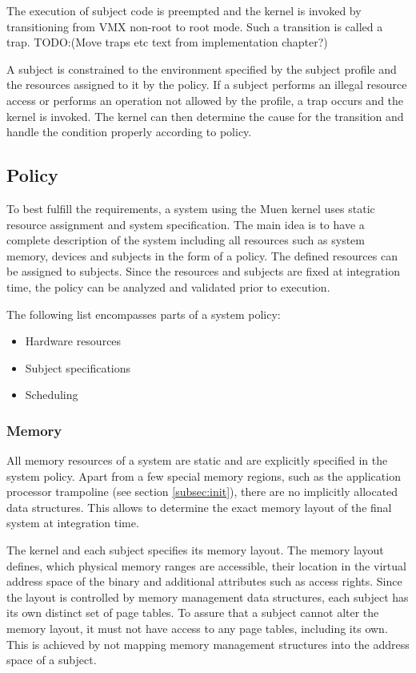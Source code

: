 The execution of subject code is preempted and the kernel is invoked by
transitioning from VMX non-root to root mode. Such a transition is called a
trap. TODO:(Move traps etc text from implementation chapter?)

A subject is constrained to the environment specified by the subject profile and
the resources assigned to it by the policy. If a subject performs an illegal
resource access or performs an operation not allowed by the profile, a trap
occurs and the kernel is invoked. The kernel can then determine the cause for
the transition and handle the condition properly according to policy.

\subsection{Policy}
To best fulfill the requirements, a system using the Muen kernel uses static
resource assignment and system specification. The main idea is to have a
complete description of the system including all resources such as system
memory, devices and subjects in the form of a policy. The defined resources can
be assigned to subjects. Since the resources and subjects are fixed at
integration time, the policy can be analyzed and validated prior to execution.

The following list encompasses parts of a system policy:
\begin{itemize}
	\item Hardware resources
	\item Subject specifications
	\item Scheduling
\end{itemize}

\subsubsection{Memory}
All memory resources of a system are static and are explicitly specified in the
system policy. Apart from a few special memory regions, such as the application
processor trampoline (see section \ref{subsec:init}), there are no implicitly
allocated data structures. This allows to determine the exact memory layout of
the final system at integration time.

The kernel and each subject specifies its memory layout. The memory layout
defines, which physical memory ranges are accessible, their location in the
virtual address space of the binary and additional attributes such as access
rights. Since the layout is controlled by memory management data structures,
each subject has its own distinct set of page tables. To assure that a subject
cannot alter the memory layout, it must not have access to any page tables,
including its own. This is achieved by not mapping memory management structures
into the address space of a subject.

